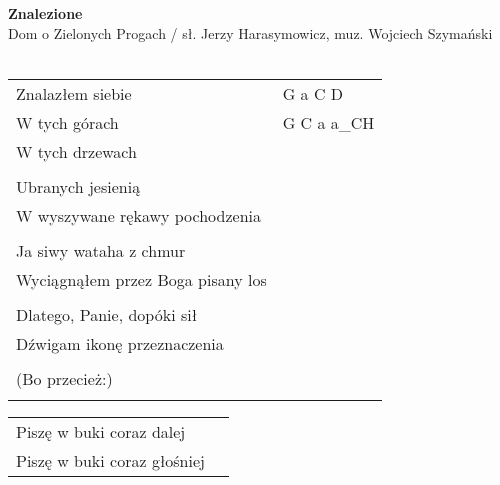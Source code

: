\documentclass[a5paper]{article}
\begin{document}


\noindent
\fontsize{12pt}{15pt}\selectfont
\textbf{Znalezione} \\
\fontsize{8pt}{10pt}\selectfont
Dom o Zielonych Progach / sł. Jerzy Harasymowicz, muz. Wojciech Szymański \\ \\
\fontsize{10pt}{12pt}\selectfont
{}
\begin{tabular}{@{}p{7.00cm}p{3cm}@{}}
\noindent
Znalazłem siebie & G a C D \\
W tych górach & G C a a\_CH \\
W tych drzewach \\ \\

Ubranych jesienią \\
W wyszywane rękawy pochodzenia \\ \\

Ja siwy wataha z chmur \\
Wyciągnąłem przez Boga pisany los \\ \\

Dlatego, Panie, dopóki sił \\
Dźwigam ikonę przeznaczenia \\ \\

(Bo przecież:) \\ \\
\end{tabular} 

\noindent
\begin{tabular}{@{}p{6.00cm}p{3cm}@{}}
Piszę w buki coraz dalej \\
Piszę w buki coraz głośniej
\end{tabular} 
\end{document}
